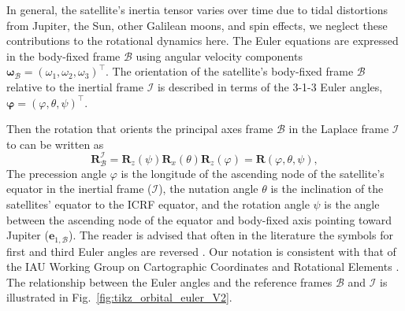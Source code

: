 \documentclass[pdflatex,sn-mathphys-num]{sn-jnl}%
\theoremstyle{thmstyleone}%
\theoremstyle{thmstyletwo}%
\theoremstyle{thmstylethree}%
\renewcommand{\vec}[1]{\boldsymbol{#1}}
\begin{document}
%
In general, the satellite's inertia tensor varies over time due to tidal distortions from Jupiter, the Sun, other Galilean moons, and spin effects, we neglect these contributions to the rotational dynamics here.
%
The Euler equations are expressed in the body-fixed frame $\mathcal{B}$ using angular velocity components ${\vec{\omega}_{\mathcal{B}} = (\omega_1, \omega_2, \omega_3)^\top}$. 
The orientation of the satellite's body-fixed frame $\mathcal{B}$ relative to the inertial frame $\mathcal{I}$
is described in terms  of the 3-1-3 Euler angles, ${\vec{\varphi} = (\varphi, \theta, \psi)^\top}$.

Then the rotation that orients the principal axes frame $\mathcal{B}$ in the Laplace frame $\mathcal{I}$ to can be written as
\begin{equation}
	\vec{R}^{\mathcal{I}}_{\mathcal{B}} =
 	\vec{R}_{z}({\psi})
	\vec{R}_{x}(\theta)
	\vec{R}_{z}(\varphi)
	= \vec{R}({\varphi},{\theta},{\psi}),
\end{equation}
The precession angle ${\varphi}$ is the longitude of the ascending node of the satellite's equator in the inertial frame ($\mathcal{I}$), the nutation angle  ${\theta}$ is the inclination of the satellites' equator to the ICRF equator, and the rotation angle ${\psi}$ is the angle between the ascending node of the equator and body-fixed axis pointing toward Jupiter ($\vec{e}_{1,\mathcal{B}}$).
%
The reader is advised that often in the literature the symbols for first and third Euler angles are reversed \citep[e.g.,][]{1980A&A....82..129B, 1981M&P....25....3E}. Our notation is consistent with that of the IAU Working Group on Cartographic Coordinates and Rotational Elements \citep{2018CeMDA.130...22A}. %
%
The relationship between the Euler angles and the reference frames $\mathcal{B}$ and $\mathcal{I}$ is illustrated in Fig.~\ref{fig:tikz_orbital_euler_V2}.
\end{document}
